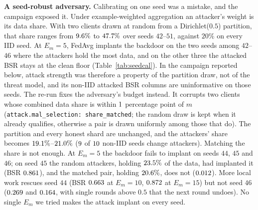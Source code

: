 \documentclass[journal]{IEEEtran}
\begin{document}
\textbf{A seed-robust adversary.} Calibrating on one seed was a mistake, and the
campaign exposed it. Under example-weighted aggregation an attacker's weight is its
data share. With two clients drawn at random from a Dirichlet($0.5$) partition,
that share ranges from $9.6\%$ to $47.7\%$ over seeds $42$--$51$,
against $20\%$ on every IID seed. At $E_m=5$, FedAvg implants the backdoor on the
two seeds among $42$--$46$ where the attackers hold the most data, and on the other
three the attacked BSR stays at the clean floor (Table~\ref{tab:seedcal}). In the
campaign reported below, attack strength was therefore a property of the partition
draw, not of the threat model, and its non-IID attacked BSR columns are
uninformative on those seeds. The re-run fixes the adversary's budget instead. It
corrupts two clients whose combined data share is within $1$ percentage
point of $m$ (\texttt{attack.mal\_selection: share\_matched}; the random draw is
kept when it already qualifies, otherwise a pair is drawn uniformly among those
that do). The partition and every honest shard are unchanged, and the attackers'
share becomes $19.1\%$--$21.0\%$ ($9$ of
$10$ non-IID seeds change attackers). Matching the share is not enough.
At $E_m=5$ the backdoor fails to implant on seeds $44$, $45$ and $46$; on seed
$45$ the random attackers, holding $23.5\%$ of the data, had
implanted it (BSR $0.861$), and the matched pair, holding
$20.6\%$, does not ($0.012$). More local
work rescues seed $44$ (BSR $0.663$ at $E_m=10$,
$0.872$ at $E_m=15$) but not seed $46$ ($0.269$ and
$0.164$, with single rounds above $0.5$ that the next round
undoes). No single $E_m$ we tried makes the attack implant on every seed.
\end{document}
